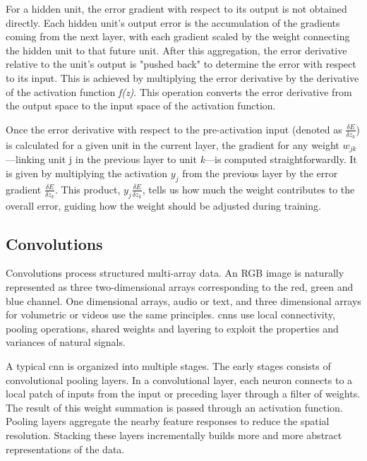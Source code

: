 For a hidden unit, the error gradient with respect to its output is not obtained directly. Each hidden unit’s output error is the accumulation of the gradients coming from the next layer, with each gradient scaled by the weight connecting the hidden unit to that future unit. After this aggregation, the error derivative relative to the unit’s output is "pushed back" to determine the error with respect to its input. This is achieved by multiplying the error derivative by the derivative of the activation function \textit{f(z)}. This operation converts the error derivative from the output space to the input space of the activation function.

Once the error derivative with respect to the pre-activation input (denoted as \(\frac{\delta E}{\delta z_k}\)) is calculated for a given unit in the current layer, the gradient for any weight \(w_{jk}\)—linking unit j in the previous layer to unit \textit{k}—is computed straightforwardly. It is given by multiplying the activation \(y_j\) from the previous layer by the error gradient \(\frac{\delta E}{\delta z_k}\). This product, \(y_j \frac{\delta E}{\delta z_k}\), tells us how much the weight contributes to the overall error, guiding how the weight should be adjusted during training.

\subsection{Convolutions}

Convolutions process structured multi-array data. An RGB image is naturally represented as three two-dimensional arrays corresponding to the red, green and blue channel. One dimensional arrays, audio or text, and three dimensional arrays for volumetric or videos use the same principles. \acrlong{cnn}s use local connectivity, pooling operations, shared weights and layering to exploit the properties and variances of natural signals. 

A typical \acrlong{cnn} is organized into multiple stages. The early stages consists of convolutional pooling layers. In a convolutional layer, each neuron connects to a local patch of inputs from the input or preceding layer through a filter of weights. The result of this weight summation is passed through an activation function. Pooling layers aggregate the nearby feature responses to reduce the spatial resolution. Stacking these layers incrementally builds more and more abstract representations of the data\cite{lecun_deep_learning_2015}. 

